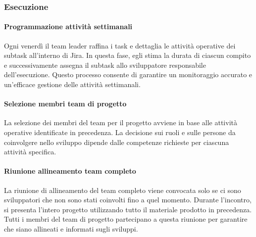         \subsubsection{Esecuzione}
            \paragraph{Programmazione attività settimanali}
            Ogni venerdì il team leader raffina i task e dettaglia le attività operative dei subtask all'interno di Jira. In questa fase,
            egli stima la durata di ciascun compito e successivamente assegna il subtask allo
            sviluppatore responsabile dell'esecuzione. Questo processo consente di garantire un monitoraggio accurato e un'efficace gestione
            delle attività settimanali.

            \paragraph{Selezione membri team di progetto}
            La selezione dei membri del team per il progetto avviene in base alle attività operative identificate in precedenza.
            La decisione sui ruoli e sulle persone da coinvolgere nello sviluppo dipende dalle competenze richieste per ciascuna attività specifica.

            \paragraph{Riunione allineamento team completo}
            La riunione di allineamento del team completo viene convocata solo se ci sono sviluppatori che non sono stati coinvolti fino a
            quel momento. Durante l'incontro, si presenta l'intero progetto utilizzando tutto il materiale prodotto in precedenza. Tutti i
            membri del team di progetto partecipano a questa riunione per garantire che siano allineati e informati sugli sviluppi.

